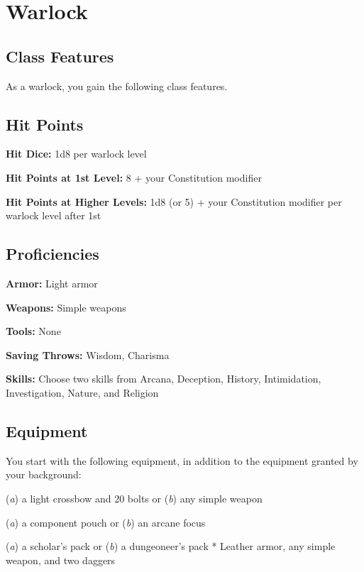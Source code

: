 \section{Warlock}

\subsection{Class Features}

As a warlock, you gain the following class features.

\subsection{Hit Points}

\textbf{Hit Dice:} 1d8 per warlock level

\textbf{Hit Points at 1st Level:} 8 + your Constitution modifier

\textbf{Hit Points at Higher Levels:} 1d8 (or 5) + your Constitution modifier per warlock level after 1st

\subsection{Proficiencies}

\textbf{Armor:} Light armor

\textbf{Weapons:} Simple weapons

\textbf{Tools:} None

\textbf{Saving Throws:} Wisdom, Charisma

\textbf{Skills:} Choose two skills from Arcana, Deception, History, Intimidation, Investigation, Nature, and Religion

\subsection{Equipment}

You start with the following equipment, in addition to the equipment granted by your background:
\item (\textit{a}) a light crossbow and 20 bolts or (\textit{b}) any simple weapon
\item (\textit{a}) a component pouch or (\textit{b}) an arcane focus
\item (\textit{a}) a scholar’s pack or (\textit{b}) a dungeoneer’s pack
* Leather armor, any simple weapon, and two daggers

